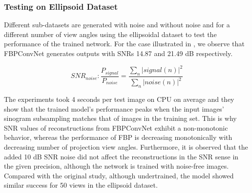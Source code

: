 \documentclass[journal, onecolumn, 11pt]{IEEEtran}
\begin{document}
\vfill\null\newpage
\subsubsection{Testing on Ellipsoid Dataset}

Different sub-datasets are generated with noise and without noise and for a different number of view angles using the ellipsoidal dataset to test the performance of the trained network. For the case illustrated in , we observe that FBPConvNet generates outputs with SNRs 14.87 and 21.49 dB respectively. 


\begin{table}[h]
\caption{\label{tab:tabname}Experiment results for training configuration described in . \newline * Noise SNR is described in }
\end{table}

\begin{equation}
    SNR_{noise}: \frac{P_{signal}}{P_{noise}} = \frac{\sum\limits_n |signal(n)|^2}{\sum\limits_n |noise(n)|^2}
    \label{eq:noisesnr}
\end{equation}

The experiments took 4 seconds per test image on CPU on average and they show that the trained model's performance peaks when  
the input images' sinogram subsampling matches that of images in the training set. This is why SNR values of reconstructions from FBPConvNet exhibit a non-monotonic behavior, whereas the performance of FBP is decreasing monotonically with decreasing number of projection view angles. Furthermore, it is observed that the added 10 dB SNR noise did not affect the reconstructions in the SNR sense in the given precision, although the network is trained with noise-free images. Compared with the original study, although undertrained, the model showed similar success for 50 views in the ellipsoid dataset. 
\end{document}
